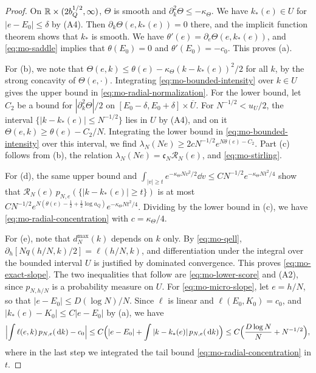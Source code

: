 \begin{proof}
On $\mathbb R\times(2b_Q^{1/2},\infty)$, $\Theta$ is smooth and $\partial_k^2\Theta\le-\kappa_\Theta$. We have $k_*(e)\in U$ for $|e-E_0|\le\delta$ by (A4). Then $\partial_k\Theta(e,k_*(e))=0$ there, and the implicit function theorem shows that $k_*$ is smooth. We have $\theta'(e)=\partial_e\Theta(e,k_*(e))$, and \eqref{eq:mo-saddle} implies that $\theta(E_0)=0$ and $\theta'(E_0)=-c_0$. This proves (a).

For (b), we note that $\Theta(e,k)\le\theta(e)-\kappa_\Theta(k-k_*(e))^2/2$ for all $k$, by the strong concavity of $\Theta(e,\cdot)$. Integrating \eqref{eq:mo-bounded-intensity} over $k\in U$ gives the upper bound in \eqref{eq:mo-radial-normalization}. For the lower bound, let $C_2$ be a bound for $|\partial_k^2\Theta|/2$ on $[E_0-\delta,E_0+\delta]\times\overline U$. For $N^{-1/2}<u_U/2$, the interval $\{|k-k_*(e)|\le N^{-1/2}\}$ lies in $U$ by (A4), and on it $\Theta(e,k)\ge\theta(e)-C_2/N$. Integrating the lower bound in \eqref{eq:mo-bounded-intensity} over this interval, we find $\lambda_N(Ne)\ge2cN^{-1/2}e^{N\theta(e)-C_2}$. Part (c) follows from (b), the relation $\lambda_N(Ne)=\mathfrak c_N\mathcal R_N(e)$, and \eqref{eq:mo-stirling}.

For (d), the same upper bound and $\int_{|v|\ge t}e^{-\kappa_\Theta Nv^2/2}\dd v\le CN^{-1/2}e^{-\kappa_\Theta Nt^2/4}$ show that $\mathcal R_N(e)\,p_{N,e}(\{|k-k_*(e)|\ge t\})$ is at most $CN^{-1/2}e^{N(\theta(e)-\frac12+\frac12\log a_Q)}e^{-\kappa_\Theta Nt^2/4}$. Dividing by the lower bound in (c), we have \eqref{eq:mo-radial-concentration} with $c=\kappa_\Theta/4$.

For (e), note that $d_N^{\max}(k)$ depends on $k$ only. By \eqref{eq:mo-qell}, $\partial_h[Nq(h/N,k)/2]=\ell(h/N,k)$, and differentiation under the integral over the bounded interval $U$ is justified by dominated convergence. This proves \eqref{eq:mo-exact-slope}. The two inequalities that follow are \eqref{eq:mo-lower-score} and (A2), since $p_{N,h/N}$ is a probability measure on $U$. For \eqref{eq:mo-micro-slope}, let $e=h/N$, so that $|e-E_0|\le D(\log N)/N$. Since $\ell$ is linear and $\ell(E_0,K_0)=c_0$, and $|k_*(e)-K_0|\le C|e-E_0|$ by (a), we have
\[
\Bigl|\int\ell(e,k)\,p_{N,e}(\,\mathrm d k)-c_0\Bigr|\le C\Bigl(|e-E_0|+\int|k-k_*(e)|\,p_{N,e}(\,\mathrm d k)\Bigr)\le C\Bigl(\frac{D\log N}N+N^{-1/2}\Bigr),
\]
where in the last step we integrated the tail bound \eqref{eq:mo-radial-concentration} in $t$.
\end{proof}

